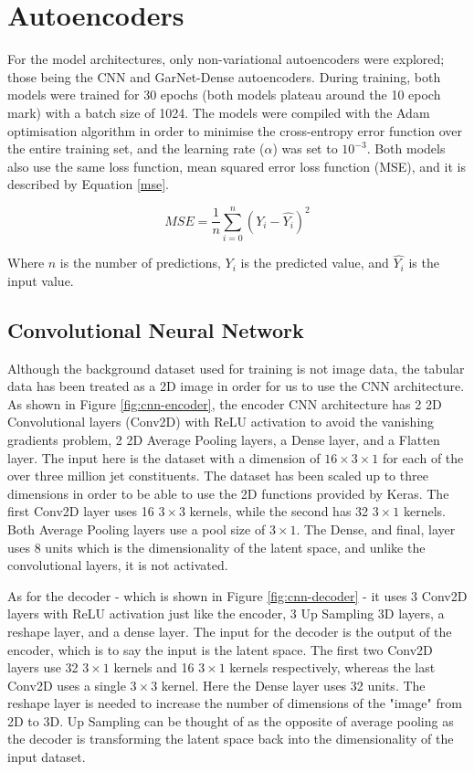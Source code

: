 \documentclass[a4paper]{article}
\theoremstyle{plain}
\theoremstyle{definition}
\begin{document}
    \section{Autoencoders}
    \label{section:autoencoders}

        For the model architectures, only non-variational autoencoders were explored; those being the CNN and GarNet-Dense autoencoders. During training, both models were trained for 30 epochs (both models plateau around the 10 epoch mark) with a batch size of 1024. The models were compiled with the Adam optimisation algorithm \cite{adam} in order to minimise the cross-entropy error function over the entire training set, and the learning rate ($\alpha$) was set to $10^{-3}$. Both models also use the same loss function, mean squared error loss function (MSE), and it is described by Equation \ref{mse}.

        \begin{equation}\label{mse}
            MSE =  \frac{1}{n} \sum_{i=0}^{n} (Y_i - \hat{Y_i})^2
        \end{equation}

        Where $n$ is the number of predictions, $Y_i$ is the predicted value, and $\hat{Y_i}$ is the input value.

        \subsection{Convolutional Neural Network}

            Although the background dataset used for training is not image data, the tabular data has been treated as a 2D image in order for us to use the CNN architecture. As shown in Figure \ref{fig:cnn-encoder}, the encoder CNN architecture has 2 2D Convolutional layers (Conv2D) with ReLU activation to avoid the vanishing gradients problem, 2 2D Average Pooling layers, a Dense layer, and a Flatten layer. The input here is the dataset with a dimension of $16 \times 3 \times 1$ for each of the over three million jet constituents. The dataset has been scaled up to three dimensions in order to be able to use the 2D functions provided by Keras. The first Conv2D layer uses 16 $3 \times 3$ kernels, while the second has 32 $3 \times 1$ kernels. Both Average Pooling layers use a pool size of $3 \times 1$. The Dense, and final, layer uses 8 units which is the dimensionality of the latent space, and unlike the convolutional layers, it is not activated.

            As for the decoder - which is shown in Figure \ref{fig:cnn-decoder} - it uses 3 Conv2D layers with ReLU activation just like the encoder, 3 Up Sampling 3D layers, a reshape layer, and a dense layer. The input for the decoder is the output of the encoder, which is to say the input is the latent space. The first two Conv2D layers use 32 $3 \times 1$ kernels and 16 $3 \times 1$ kernels respectively, whereas the last Conv2D uses a single $3 \times 3$ kernel. Here the Dense layer uses 32 units. The reshape layer is needed to increase the number of dimensions of the "image" from 2D to 3D. Up Sampling can be thought of as the opposite of average pooling as the decoder is transforming the latent space back into the dimensionality of the input dataset.
\end{document}

